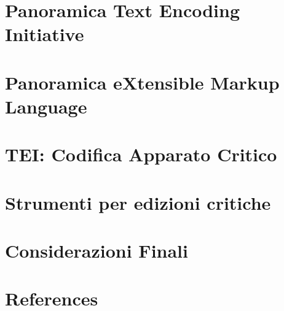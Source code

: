 \documentclass{beamer}
\begin{document}
\section{Panoramica Text Encoding Initiative}
%

\section{Panoramica eXtensible Markup Language}
%

\section{TEI: Codifica Apparato Critico}


\section{Strumenti per edizioni critiche}
%

\section{Considerazioni Finali}
%

\section{References}
%
\end{document}
